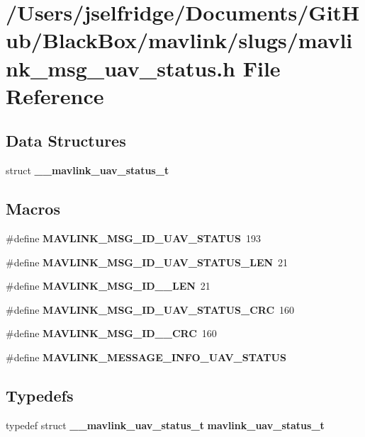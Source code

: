 \section{/\+Users/jselfridge/\+Documents/\+Git\+Hub/\+Black\+Box/mavlink/slugs/mavlink\+\_\+msg\+\_\+uav\+\_\+status.h File Reference}
\label{mavlink__msg__uav__status_8h}
\subsection*{Data Structures}
\begin{DoxyCompactItemize}
\item 
struct \textbf{ \+\_\+\+\_\+mavlink\+\_\+uav\+\_\+status\+\_\+t}
\end{DoxyCompactItemize}
\subsection*{Macros}
\begin{DoxyCompactItemize}
\item 
\#define \textbf{ M\+A\+V\+L\+I\+N\+K\+\_\+\+M\+S\+G\+\_\+\+I\+D\+\_\+\+U\+A\+V\+\_\+\+S\+T\+A\+T\+US}~193
\item 
\#define \textbf{ M\+A\+V\+L\+I\+N\+K\+\_\+\+M\+S\+G\+\_\+\+I\+D\+\_\+\+U\+A\+V\+\_\+\+S\+T\+A\+T\+U\+S\+\_\+\+L\+EN}~21
\item 
\#define \textbf{ M\+A\+V\+L\+I\+N\+K\+\_\+\+M\+S\+G\+\_\+\+I\+D\+\_\+\_\+\+L\+EN}~21
\item 
\#define \textbf{ M\+A\+V\+L\+I\+N\+K\+\_\+\+M\+S\+G\+\_\+\+I\+D\+\_\+\+U\+A\+V\+\_\+\+S\+T\+A\+T\+U\+S\+\_\+\+C\+RC}~160
\item 
\#define \textbf{ M\+A\+V\+L\+I\+N\+K\+\_\+\+M\+S\+G\+\_\+\+I\+D\+\_\+\_\+\+C\+RC}~160
\item 
\#define \textbf{ M\+A\+V\+L\+I\+N\+K\+\_\+\+M\+E\+S\+S\+A\+G\+E\+\_\+\+I\+N\+F\+O\+\_\+\+U\+A\+V\+\_\+\+S\+T\+A\+T\+US}
\end{DoxyCompactItemize}
\subsection*{Typedefs}
\begin{DoxyCompactItemize}
\item 
typedef struct \textbf{ \+\_\+\+\_\+mavlink\+\_\+uav\+\_\+status\+\_\+t} \textbf{ mavlink\+\_\+uav\+\_\+status\+\_\+t}
\end{DoxyCompactItemize}


